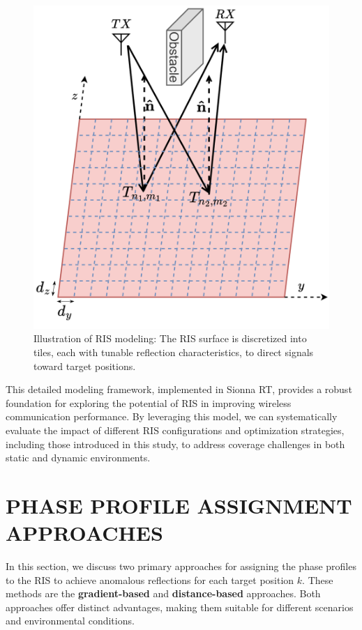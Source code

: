 \documentclass{IEEEoj}
\begin{document}
\begin{figure}
	\centering \includegraphics[width=.62\linewidth]{RIS_Modeling.png}
	\caption{Illustration of RIS modeling: The RIS surface is discretized into tiles, each with tunable reflection characteristics, to direct signals toward target positions.}
	\label{RIS_Modeling}
	\vspace{-0.5cm}
\end{figure}

This detailed modeling framework, implemented in Sionna RT, provides a robust foundation for exploring the potential of RIS in improving wireless communication performance. By leveraging this model, we can systematically evaluate the impact of different RIS configurations and optimization strategies, including those introduced in this study, to address coverage challenges in both static and dynamic environments.

\section{PHASE PROFILE ASSIGNMENT APPROACHES}
In this section, we discuss two primary approaches for assigning the phase profiles to the RIS to achieve anomalous reflections for each target position \( k \). These methods are the \textbf{gradient-based} \cite{phase_grad_paper} and \textbf{distance-based} \cite{Tang} approaches. Both approaches offer distinct advantages, making them suitable for different scenarios and environmental conditions.
\end{document}
